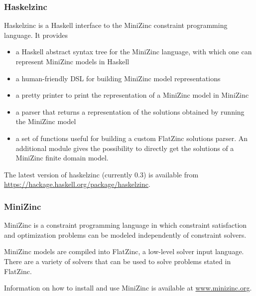 \subsubsection{Haskelzinc}

Haskelzinc is a Haskell interface to the MiniZinc constraint
programming language.
%
It provides
\begin{itemize}
\item a Haskell abstract syntax tree for the MiniZinc language, with
  which one can represent MiniZinc models in Haskell
\item a human-friendly DSL for building MiniZinc model representations
\item a pretty printer to print the representation of a MiniZinc model
  in MiniZinc
\item a parser that returns a representation of the solutions obtained
  by running the MiniZinc model
\item a set of functions useful for building a custom FlatZinc
  solutions parser.
  An additional module gives the possibility to directly get the
  solutions of a MiniZinc finite domain model.
\end{itemize}

The latest version of haskelzinc (currently 0.3) is available from
\url{https://hackage.haskell.org/package/haskelzinc}.

\subsubsection{MiniZinc}

MiniZinc is a constraint programming language in which constraint satisfaction
and optimization problems can be modeled independently of constraint solvers.

MiniZinc models are compiled into FlatZinc, a low-level solver input language.
There are a variety of solvers that can be used to solve problems stated in
FlatZinc.

Information on how to install and use MiniZinc is available at
\url{www.minizinc.org}.
